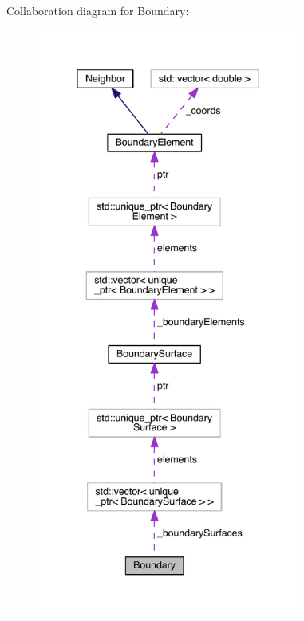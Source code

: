 Collaboration diagram for Boundary\+:\nopagebreak
\begin{figure}[H]
\begin{center}
\leavevmode
\includegraphics[height=550pt]{classBoundary__coll__graph}
\end{center}
\end{figure}
